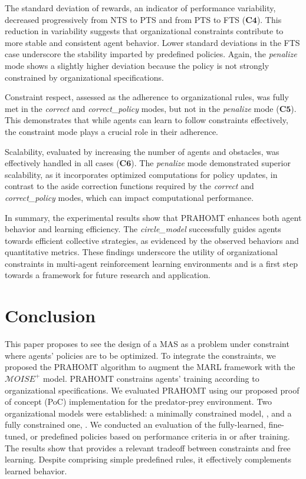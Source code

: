 \documentclass[runningheads]{llncs}
\theoremstyle{freethm}
\theoremstyle{proofoutline}
\newcounter{proof}
\begin{document}
The standard deviation of rewards, an indicator of performance variability, decreased progressively from NTS to PTS and from PTS to FTS ($\mathbf{C4}$). This reduction in variability suggests that organizational constraints contribute to more stable and consistent agent behavior. Lower standard deviations in the FTS case underscore the stability imparted by predefined policies. Again, the \textit{penalize} mode shows a slightly higher deviation because the policy is not strongly constrained by organizational specifications.

Constraint respect, assessed as the adherence to organizational rules, was fully met in the \textit{correct} and \textit{correct\_policy} modes, but not in the \textit{penalize} mode ($\mathbf{C5}$). This demonstrates that while agents can learn to follow constraints effectively, the constraint mode plays a crucial role in their adherence.

Scalability, evaluated by increasing the number of agents and obstacles, was effectively handled in all cases ($\mathbf{C6}$). The \textit{penalize} mode demonstrated superior scalability, as it incorporates optimized computations for policy updates, in contrast to the aside correction functions required by the \textit{correct} and \textit{correct\_policy} modes, which can impact computational performance.

In summary, the experimental results show that PRAHOMT enhances both agent behavior and learning efficiency. The \textit{circle\_model} successfully guides agents towards efficient collective strategies, as evidenced by the observed behaviors and quantitative metrics. These findings underscore the utility of organizational constraints in multi-agent reinforcement learning environments and is a first step towards a framework for future research and application.


\section{Conclusion}\label{sec:conclusion}

This paper proposes to see the design of a MAS as a problem under constraint where agents' policies are to be optimized. To integrate the constraints, we proposed the PRAHOMT algorithm to augment the MARL framework with the $\mathcal{M}OISE^+$ model. PRAHOMT constrains agents' training according to organizational specifications. We evaluated PRAHOMT using our proposed proof of concept (PoC) implementation for the  predator-prey environment. Two organizational models were established: a minimally constrained model, , and a fully constrained one, . We conducted an evaluation of the fully-learned, fine-tuned, or predefined policies based on performance criteria in or after training.
%
The results show that  provides a relevant tradeoff between constraints and free learning. Despite comprising simple predefined rules, it effectively complements learned behavior.
\end{document}
